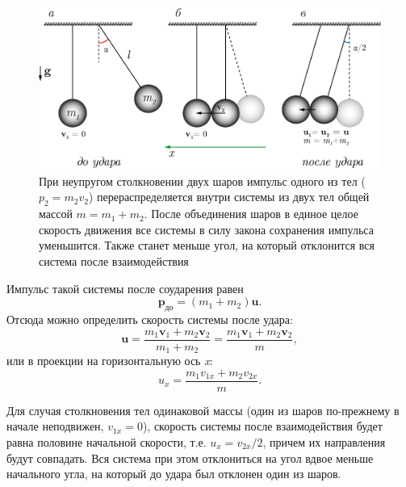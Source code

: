 \documentclass[14pt,a4paper,oneside]{extarticle}	%
\begin{document}
\begin{figure}[H]
	\centering 	
	\includegraphics[width=0.9\linewidth]{hit-5.png}
	\caption{При неупругом столкновении двух шаров импульс одного из тел ($ p_2=m_2v_2 $) перераспределяется внутри системы из двух тел общей массой $ m= m_1 + m_2 $. После объединения шаров в единое целое скорость движения все системы в силу закона сохранения импульса уменьшится. Также станет меньше угол, на который отклонится вся система после взаимодействия}
	\label{hit-5}
\end{figure}

Импульс такой системы после соударения равен $$ \textbf{p}_{\text{до}}  = (m_1 + m_2) \textbf{u}.$$
Отсюда можно определить скорость системы после удара:
	\begin{equation}\label{hit-1eq6}
\textbf{u}  = \dfrac{m_1 \textbf{v}_1 + m_2 \textbf{v}_2}{m_1 + m_2}=\dfrac{m_1 \textbf{v}_1 + m_2 \textbf{v}_2}{m},
\end{equation}
или в проекции на горизонтальную ось \textit{x}:
	\begin{equation}\label{hit-1eq7}
u_x  = \dfrac{m_1 v_{1x} + m_2 v_{2x}}{m}.
\end{equation}

Для случая столкновения тел одинаковой массы (один из шаров по-прежнему в начале неподвижен, $ v_{1x}=0 $), скорость системы после взаимодействия будет равна половине начальной скорости, т.е. $ u_x = v_{2x}/2 $, причем их направления будут совпадать.
Вся система при этом отклониться на угол вдвое меньше начального угла, на который до удара был отклонен один из шаров.
\end{document}
